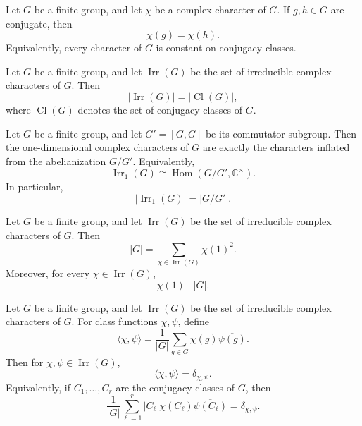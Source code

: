 \begin{theorem}
\label{thm:characters-are-class-functions}
Let \(G\) be a finite group, and let \(\chi\) be a complex character of
\(G\). If \(g,h\in G\) are conjugate, then
\[
\chi(g)=\chi(h).
\]
Equivalently, every character of \(G\) is constant on conjugacy classes.
\end{theorem}

\begin{theorem}
\label{thm:number-of-irreducible-characters}
Let \(G\) be a finite group, and let \(\operatorname{Irr}(G)\) be the set of
irreducible complex characters of \(G\). Then
\[
|\operatorname{Irr}(G)|
=
|\operatorname{Cl}(G)|,
\]
where \(\operatorname{Cl}(G)\) denotes the set of conjugacy classes of \(G\).
\end{theorem}

\begin{theorem}
\label{thm:linear-characters-and-abelianization}
Let \(G\) be a finite group, and let \(G'=[G,G]\) be its commutator subgroup.
Then the one-dimensional complex characters of \(G\) are exactly the
characters inflated from the abelianization \(G/G'\). Equivalently,
\[
\operatorname{Irr}_1(G)
\cong
\operatorname{Hom}(G/G',\mathbb C^\times).
\]
In particular,
\[
|\operatorname{Irr}_1(G)|=|G/G'|.
\]
\end{theorem}

\begin{theorem}
\label{thm:degree-formula-for-irreducible-characters}
Let \(G\) be a finite group, and let \(\operatorname{Irr}(G)\) be the set of
irreducible complex characters of \(G\). Then
\[
|G|
=
\sum_{\chi\in\operatorname{Irr}(G)}\chi(1)^2.
\]
Moreover, for every \(\chi\in\operatorname{Irr}(G)\),
\[
\chi(1)\mid |G|.
\]
\end{theorem}


\begin{theorem}
\label{thm:row-orthogonality-irreducible-characters}
Let \(G\) be a finite group, and let \(\operatorname{Irr}(G)\) be the set of
irreducible complex characters of \(G\). For class functions \(\chi,\psi\),
define
\[
\langle \chi,\psi\rangle
=
\frac{1}{|G|}
\sum_{g\in G}\chi(g)\overline{\psi(g)}.
\]
Then for \(\chi,\psi\in\operatorname{Irr}(G)\),
\[
\langle \chi,\psi\rangle=\delta_{\chi,\psi}.
\]
Equivalently, if \(C_1,\dots,C_r\) are the conjugacy classes of \(G\), then
\[
\frac{1}{|G|}
\sum_{\ell=1}^r
|C_\ell|\chi(C_\ell)\overline{\psi(C_\ell)}
=
\delta_{\chi,\psi}.
\]
\end{theorem}


